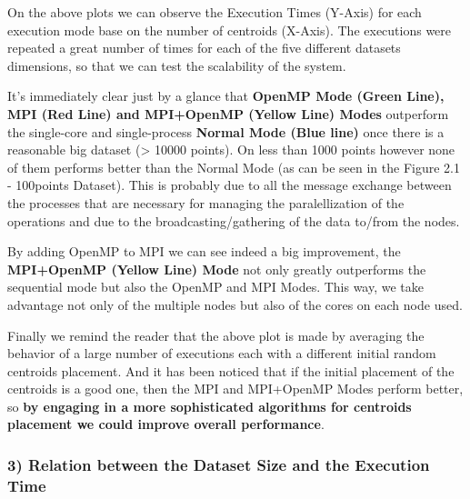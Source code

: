 \documentclass[11pt]{article}
\begin{document}
On the above plots we can observe the Execution Times (Y-Axis) for each
execution mode base on the number of centroids (X-Axis). The executions
were repeated a great number of times for each of the five different
datasets dimensions, so that we can test the scalability of the system.

It's immediately clear just by a glance that \textbf{OpenMP Mode (Green
Line), MPI (Red Line) and MPI+OpenMP (Yellow Line) Modes} outperform the
single-core and single-process \textbf{Normal Mode (Blue line)} once
there is a reasonable big dataset (\textgreater{} 10000 points). On less
than 1000 points however none of them performs better than the Normal
Mode (as can be seen in the Figure 2.1 - 100points Dataset). This is
probably due to all the message exchange between the processes that are
necessary for managing the paralellization of the operations and due to
the broadcasting/gathering of the data to/from the nodes.

By adding OpenMP to MPI we can see indeed a big improvement, the
\textbf{MPI+OpenMP (Yellow Line) Mode} not only greatly outperforms the
sequential mode but also the OpenMP and MPI Modes. This way, we take
advantage not only of the multiple nodes but also of the cores on each
node used.

Finally we remind the reader that the above plot is made by averaging
the behavior of a large number of executions each with a different
initial random centroids placement. And it has been noticed that if the
initial placement of the centroids is a good one, then the MPI and
MPI+OpenMP Modes perform better, so \textbf{by engaging in a more
sophisticated algorithms for centroids placement we could improve
overall performance}.

    \hypertarget{relation-between-the-dataset-size-and-the-execution-time}{%
\subsubsection{3) Relation between the Dataset Size and the Execution
Time}\label{relation-between-the-dataset-size-and-the-execution-time}}
\end{document}
